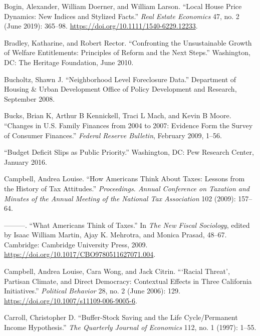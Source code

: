 \documentclass[12pt,oneside]{psthesis}
\begin{document}
\leavevmode\hypertarget{ref-bogin2019local}{}%
Bogin, Alexander, William Doerner, and William Larson. ``Local House Price Dynamics: New Indices and Stylized Facts.'' \emph{Real Estate Economics} 47, no. 2 (June 2019): 365--98. \url{https://doi.org/10.1111/1540-6229.12233}.

\leavevmode\hypertarget{ref-bradley2010confronting}{}%
Bradley, Katharine, and Robert Rector. ``Confronting the Unsustainable Growth of Welfare Entitlements: Principles of Reform and the Next Steps.'' Washington, DC: The Heritage Foundation, June 2010.

\leavevmode\hypertarget{ref-bucholtz2008neighborhood}{}%
Bucholtz, Shawn J. ``Neighborhood Level Foreclosure Data.'' Department of Housing \& Urban Development Office of Policy Development and Research, September 2008.

\leavevmode\hypertarget{ref-bucks2009changes}{}%
Bucks, Brian K, Arthur B Kennickell, Traci L Mach, and Kevin B Moore. ``Changes in U.S. Family Finances from 2004 to 2007: Evidence Form the Survey of Consumer Finances.'' \emph{Federal Reserve Bulletin}, February 2009, 1--56.

\leavevmode\hypertarget{ref-2016budget}{}%
``Budget Deficit Slips as Public Priority.'' Washington, DC: Pew Research Center, January 2016.

\leavevmode\hypertarget{ref-campbell2009how}{}%
Campbell, Andrea Louise. ``How Americans Think About Taxes: Lessons from the History of Tax Attitudes.'' \emph{Proceedings. Annual Conference on Taxation and Minutes of the Annual Meeting of the National Tax Association} 102 (2009): 157--64.

\leavevmode\hypertarget{ref-campbell2009what}{}%
---------. ``What Americans Think of Taxes.'' In \emph{The New Fiscal Sociology}, edited by Isaac William Martin, Ajay K. Mehrotra, and Monica Prasad, 48--67. Cambridge: Cambridge University Press, 2009. \url{https://doi.org/10.1017/CBO9780511627071.004}.

\leavevmode\hypertarget{ref-campbell2006racial}{}%
Campbell, Andrea Louise, Cara Wong, and Jack Citrin. ```Racial Threat', Partisan Climate, and Direct Democracy: Contextual Effects in Three California Initiatives.'' \emph{Political Behavior} 28, no. 2 (June 2006): 129. \url{https://doi.org/10.1007/s11109-006-9005-6}.

\leavevmode\hypertarget{ref-carroll1997bufferstock}{}%
Carroll, Christopher D. ``Buffer-Stock Saving and the Life Cycle/Permanent Income Hypothesis.'' \emph{The Quarterly Journal of Economics} 112, no. 1 (1997): 1--55.
\end{document}

